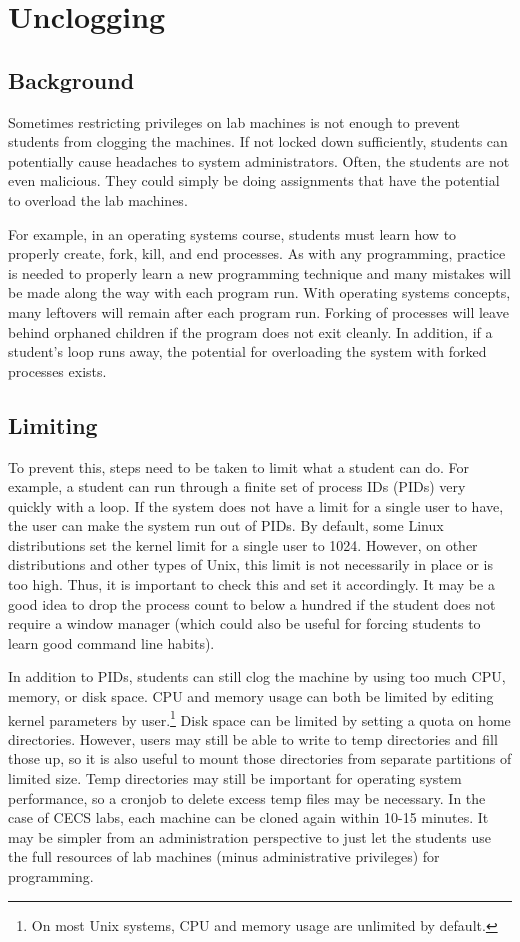 \section{Unclogging}\label{sec:unclogging}
\subsection{Background}
Sometimes restricting privileges on lab machines is not enough to prevent students from clogging the machines.  If not locked down sufficiently, students can potentially cause headaches to system administrators.  Often, the students are not even malicious.  They could simply be doing assignments that have the potential to overload the lab machines.

For example, in an operating systems course, students must learn how to properly create, fork, kill, and end processes.  As with any programming, practice is needed to properly learn a new programming technique and many mistakes will be made along the way with each program run.  With operating systems concepts, many leftovers will remain after each program run.  Forking of processes will leave behind orphaned children if the program does not exit cleanly.  In addition, if a student's loop runs away, the potential for overloading the system with forked processes exists.  
\subsection{Limiting}
To prevent this, steps need to be taken to limit what a student can do.  For example, a student can run through a finite set of process IDs (PIDs) very quickly with a loop.  If the system does not have a limit for a single user to have, the user can make the system run out of PIDs.  By default, some Linux distributions set the kernel limit for a single user to 1024.  However, on other distributions and other types of Unix, this limit is not necessarily in place or is too high.  Thus, it is important to check this and set it accordingly.  It may be a good idea to drop the process count to below a hundred if the student does not require a window manager (which could also be useful for forcing students to learn good command line habits).  

In addition to PIDs, students can still clog the machine by using too much CPU, memory, or disk space.  CPU and memory usage can both be limited by editing kernel parameters by user.\footnote{On most Unix systems, CPU and memory usage are unlimited by default.}  Disk space can be limited by setting a quota on home directories.  However, users may still be able to write to temp directories and fill those up, so it is also useful to mount those directories from separate partitions of limited size.  Temp directories may still be important for operating system performance, so a cronjob to delete excess temp files may be necessary.  In the case of CECS labs, each machine can be cloned again within 10-15 minutes.  It may be simpler from an administration perspective to just let the students use the full resources of lab machines (minus administrative privileges) for programming.  
